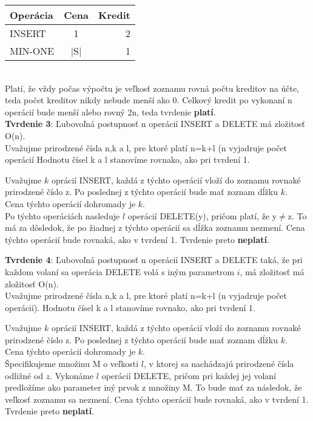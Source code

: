 \documentclass[paper=a4, fontsize=11pt]{scrartcl} %
\numberwithin{equation}{section} %
\numberwithin{figure}{section} %
\numberwithin{table}{section} %
\begin{document}
  \begin{tabular}{ | l | c | r | }
    \hline
    Operácia & Cena & Kredit \\	
    \hline
    INSERT & 1 & 2 \\ 
    MIN-ONE & |S| & 1 \\
    \hline
  \end{tabular}\\

Platí, že vždy počas výpočtu je veľkosť zoznamu rovná počtu kreditov na účte, teda počet kreditov nikdy nebude menší ako 0.
Celkový kredit po vykonaní n operácií bude menší alebo rovný 2n, teda tvrdenie \textbf{platí}. \\


\textbf{Tvrdenie 3}: Ľubovoľná postupnosť n operácií INSERT a DELETE má zložitosť O(n). \\

Uvažujme prirodzené čísla n,k a l, pre ktoré platí n=k+l (n vyjadruje počet operácií
Hodnotu čísel k a l stanovíme rovnako, ako pri tvrdení 1.

Uvažujme $k$ oprácií INSERT, každá z týchto operácií vloží do zoznamu rovnaké prirodzené číslo z.
Po poslednej z týchto operácií bude mať zoznam dĺžku $k$. \\

Cena týchto operácií dohromady je $k$. \\

Po týchto operáciách nasleduje $l$ operácií DELETE(y), pričom platí, že y$\neq$z. To má za dôsledok, že po žiadnej z týchto operácií sa dĺžka zoznamu nezmení. Cena týchto operácií bude rovnaká, ako v tvrdení 1.
Tvrdenie preto \textbf{neplatí}.

\textbf{Tvrdenie 4}: Ľubovoľná postupnosť n operácií INSERT a DELETE taká, že pri každom volaní sa operácia DELETE volá s iným parametrom $i$, má zložitosť má zložitosť O(n). \\

Uvažujme prirodzené čísla n,k a l, pre ktoré platí n=k+l (n vyjadruje počet operácií).
Hodnotu čísel k a l stanovíme rovnako, ako pri tvrdení 1.

Uvažujme $k$ oprácií INSERT, každá z týchto operácií vloží do zoznamu rovnaké prirodzené číslo z.
Po poslednej z týchto operácií bude mať zoznam dĺžku $k$. \\

Cena týchto operácií dohromady je $k$. \\

Špecifikujeme množinu M o veľkosti $l$, v ktorej sa nachádzajú prirodzené čísla odližné od $z$.
Vykonáme $l$ operácií DELETE, pričom pri každej jej volaní predložíme ako parameter iný prvok z množiny M.
To bude mať za následok, že veľkosť zoznamu sa nezmení. Cena týchto operácií bude rovnaká, ako v tvrdení 1.
Tvrdenie preto \textbf{neplatí}.
\end{document}
